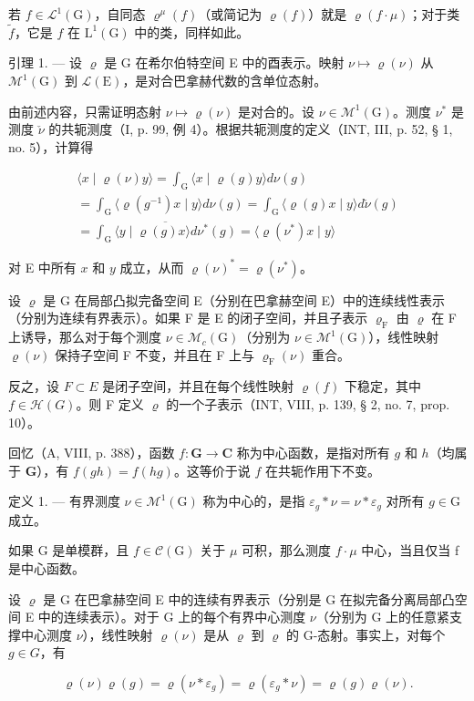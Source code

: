 若 \(f \in \mathcal{L}^{1}(\mathrm{G})\)，自同态 \(\varrho^{\mu}(f)\)（或简记为 \(\varrho(f)\)）就是 \(\varrho(f \cdot \mu)\)；对于类 \(\tilde{f}\)，它是 \(f\) 在 \(\mathrm{L}^{1}(\mathrm{G})\) 中的类，同样如此。

引理 1. --- 设 \(\varrho\) 是 G 在希尔伯特空间 E 中的酉表示。映射 \(\nu \mapsto \varrho(\nu)\) 从 \(\mathcal{M}^{1}(\mathrm{G})\) 到 \(\mathcal{L}(\mathrm{E})\)，是对合巴拿赫代数的含单位态射。

由前述内容，只需证明态射 \(\nu \mapsto \varrho(\nu)\) 是对合的。设 \(\nu \in \mathcal{M}^{1}(\mathrm{G})\)。测度 \(\nu^{*}\) 是测度 \(\check{\nu}\) 的共轭测度（I, p. 99, 例 4）。根据共轭测度的定义（INT, III, p. 52, § 1, no. 5），计算得

\[
\begin{array}{c} \langle x \mid \varrho (\nu) y \rangle = \int_ {\mathrm{G}} \langle x \mid \varrho (g) y \rangle d \nu (g) \\ = \int_ {\mathrm{G}} \langle \varrho (g ^ {- 1}) x \mid y \rangle d \nu (g) = \int_ {\mathrm{G}} \langle \varrho (g) x \mid y \rangle d \check {\nu} (g) \\ = \overline {{\int_ {\mathrm{G}} \langle y \mid \varrho (g) x \rangle d \nu^ {*} (g)}} = \langle \varrho (\nu^ {*}) x \mid y \rangle \end{array}
\]

对 E 中所有 \(x\) 和 \(y\) 成立，从而 \(\varrho(\nu)^{*} = \varrho(\nu^{*})\)。

设 \(\varrho\) 是 G 在局部凸拟完备空间 E（分别在巴拿赫空间 E）中的连续线性表示（分别为连续有界表示）。如果 F 是 E 的闭子空间，并且子表示 \(\varrho_{\mathrm{F}}\) 由 \(\varrho\) 在 F 上诱导，那么对于每个测度 \(\nu \in \mathcal{M}_c(\mathrm{G})\)（分别为 \(\nu \in \mathcal{M}^1 (\mathrm{G})\)），线性映射 \(\varrho (\nu)\) 保持子空间 F 不变，并且在 F 上与 \(\varrho_{\mathrm{F}}(\nu)\) 重合。

反之，设 \(F \subset E\) 是闭子空间，并且在每个线性映射 \(\varrho(f)\) 下稳定，其中 \(f \in \mathcal{H}(G)\)。则 F 定义 \(\varrho\) 的一个子表示（INT, VIII, p. 139, § 2, no. 7, prop. 10）。

回忆（A, VIII, p. 388），函数 \(f \colon \mathbf{G} \to \mathbf{C}\) 称为中心函数，是指对所有 \(g\) 和 \(h\)（均属于 \(\mathbf{G}\)），有 \(f(gh) = f(hg)\)。这等价于说 \(f\) 在共轭作用下不变。

定义 1. --- 有界测度 \(\nu \in \mathcal{M}^{1}(\mathrm{G})\) 称为中心的，是指 \(\varepsilon_{g} * \nu = \nu * \varepsilon_{g}\) 对所有 \(g \in \mathrm{G}\) 成立。

如果 G 是单模群，且 \(f \in \mathcal{C}(\mathrm{G})\) 关于 \(\mu\) 可积，那么测度 \(f \cdot \mu\) 中心，当且仅当 f 是中心函数。

设 \(\varrho\) 是 G 在巴拿赫空间 E 中的连续有界表示（分别是 G 在拟完备分离局部凸空间 E 中的连续表示）。对于 G 上的每个有界中心测度 \(\nu\)（分别为 G 上的任意紧支撑中心测度 \(\nu\)），线性映射 \(\varrho(\nu)\) 是从 \(\varrho\) 到 \(\varrho\) 的 G-态射。事实上，对每个 \(g \in G\)，有

\[
\varrho (\nu) \varrho (g) = \varrho (\nu * \varepsilon_ {g}) = \varrho (\varepsilon_ {g} * \nu) = \varrho (g) \varrho (\nu).
\]

